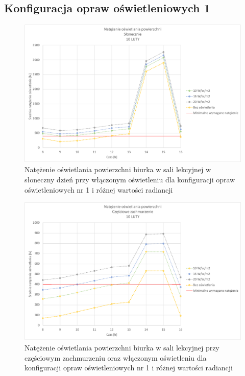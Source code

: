 \documentclass[a4paper,12pt]{article}
\begin{document}
	\subsection{Konfiguracja opraw oświetleniowych 1}
	\label{subsec:oswietlenie_1}

	\begin{figure}[ht!]
		\centering
		\includegraphics[scale=0.8]{Wykresy/oswietlenie_1_slonecznie.pdf}
		\caption{Natężenie oświetlania powierzchni biurka w sali lekcyjnej w słoneczny dzień przy włączonym oświetleniu dla konfiguracji opraw oświetleniowych nr 1 i różnej wartości radiancji}
		\label{oswietlenie_1_slonecznie}
	\end{figure}

	\begin{figure}[!ht]
		\centering
		\includegraphics[scale=0.8]{Wykresy/oswietlenie_1_czesciowe_zachmurzenie.pdf}
		\caption{Natężenie oświetlania powierzchni biurka w sali lekcyjnej przy częściowym zachmurzeniu  oraz włączonym oświetleniu dla konfiguracji opraw oświetleniowych nr 1 i różnej wartości radiancji}
		\label{oswietlenie_1_czesciowe_zachmurzenie}
	\end{figure}
\end{document}
